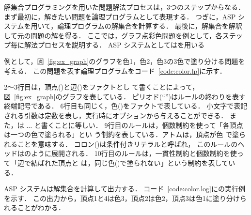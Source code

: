 


解集合プログラミングを用いた問題解法プロセスは，3つのステップからなる．
まず最初に，解きたい問題を論理プログラムとして表現する．
つぎに，ASP システムを用いて，論理プログラムの解集合を計算する．
最後に，解集合を解釈して元の問題の解を得る．
%
ここでは，グラフ点彩色問題を例として，各ステップ毎に解法プロセスを説明する．
ASP システムとしては{\clingo}を用いる

例として，図~\ref{fig:ex_graph}のグラフを色1，色2，色3の3色で塗り分ける問題を考える．
この問題を表す論理プログラムをコード~\ref{code:color.lp}に示す．

2〜3行目は，頂点()と辺()をファクトとし
て書くことによって，図~\ref{fig:ex_graph}のグラフを表している．
ピリオド(``'')はルールの終わりを表す終端記号である．
6行目も同じく，色()をファクトで表している．
小文字で表記される引数は定数を表し，{\clingo}実行時にオプションから与えることができる．
また，は  $\ldots$ と書くことに等しい．
%
9行目のルールは，個数制約を使って「各頂点は一つの色で塗られる」とい
う制約を表している．アトムは，頂点が色
で塗られることを意味する．
コロン(\code{:})は条件付きリテラルと呼ばれ，
このルールのヘッドはのように展開される．
10行目のルールは，一貫性制約と個数制約を使って「辺で結ばれた頂点と
は，同じ色()で塗られない」という制約を表している．

ASP システムは解集合を計算して出力する．
コード~\ref{code:color.log}に{\clingo}の実行例を示す．
この出力から，頂点1と4は色3，頂点2は色2，頂点3は色1に塗り分けられることがわかる．

